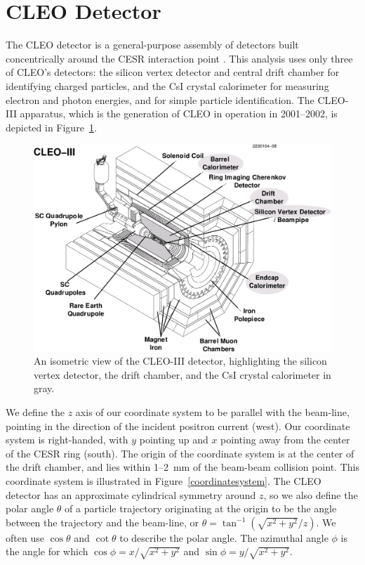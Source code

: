 \documentclass{cornell}
\begin{document}
\section{CLEO Detector}

The CLEO detector is a general-purpose assembly of detectors built
concentrically around the CESR interaction point \cite{cleoiii}
\cite{driii}.  This analysis uses only three of CLEO's detectors: the
silicon vertex detector and central drift chamber for identifying
charged particles, and the CsI crystal calorimeter for measuring
electron and photon energies, and for simple particle identification.
The CLEO-III apparatus, which is the generation of CLEO in operation
in 2001--2002, is depicted in Figure~\ref{cleoiii}.

\begin{figure}
  \begin{center}
    \includegraphics[width=0.75\linewidth]{plots/cleoiii}
  \end{center}
  \caption[Isometric view of the CLEO-III detector]{\label{cleoiii} An
  isometric view of the CLEO-III detector, highlighting the silicon
  vertex detector, the drift chamber, and the CsI crystal calorimeter
  in gray.}
\end{figure}

We define the $z$ axis of our coordinate system to be parallel with
the beam-line, pointing in the direction of the incident positron
current (west).  Our coordinate system is right-handed, with $y$
pointing up and $x$ pointing away from the center of the CESR ring
(south).  The origin of the coordinate system is at the center of the
drift chamber, and lies within 1--2~mm of the beam-beam collision
point.  This coordinate system is illustrated in
Figure~\ref{coordinatesystem}.  The CLEO detector has an approximate
cylindrical symmetry around $z$, so we also define the polar angle
$\theta$ of a particle trajectory originating at the origin to be the
angle between the trajectory and the beam-line, or $\theta =
\tan^{-1}\left(\sqrt{x^2+y^2}/z\right)$.  We often use $\cos\theta$
and $\cot\theta$ to describe the polar angle.  The azimuthal angle
$\phi$ is the angle for which $\cos \phi = x/\sqrt{x^2+y^2}$ and $\sin
\phi = y/\sqrt{x^2+y^2}$.
\end{document}
